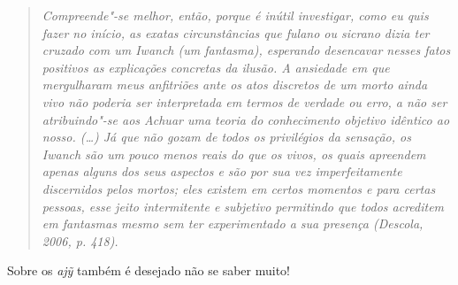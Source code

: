 \begin{quote}
\emph{Compreende"-se melhor, então, porque é inútil investigar, como eu quis
fazer no início, as exatas circunstâncias que fulano ou sicrano dizia
ter cruzado com um Iwanch (um fantasma), esperando desencavar nesses
fatos positivos as explicações concretas da ilusão. A ansiedade em que
mergulharam meus anfitriões ante os atos discretos de um morto ainda
vivo não poderia ser interpretada em termos de verdade ou erro, a não
ser atribuindo"-se aos Achuar uma teoria do conhecimento objetivo
idêntico ao nosso. (\ldots{}) Já que não gozam de todos os privilégios da
sensação, os Iwanch são um pouco menos reais do que os vivos, os quais
apreendem apenas alguns dos seus aspectos e são por sua vez
imperfeitamente discernidos pelos mortos; eles existem em certos
momentos e para certas pessoas, esse jeito intermitente e subjetivo
permitindo que todos acreditem em fantasmas mesmo sem ter experimentado
a sua presença (Descola, 2006, p. 418).}
\end{quote}

Sobre os \emph{ajỹ} também é desejado não se saber muito!
